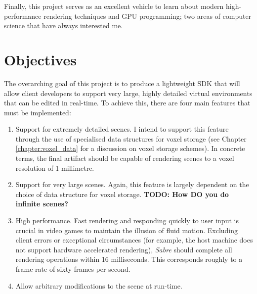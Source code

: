 Finally, this project serves as an excellent vehicle to learn about modern high-performance rendering techniques and GPU programming; two areas of computer science that have always interested me.

\section{Objectives}
The overarching goal of this project is to produce a lightweight SDK that will allow  client developers to support very large, highly detailed virtual environments that can be edited in real-time. To achieve this, there are four main features that must be implemented:

\begin{enumerate}
    \item Support for extremely detailed scenes. I intend to support this feature through the use of specialised data structures for voxel storage (see Chapter \ref{chapter:voxel_data} for a discussion on voxel storage schemes). In concrete terms, the final artifact should be capable of rendering scenes to a voxel resolution of 1 millimetre.
    
    \item Support for very large scenes. Again, this feature is largely dependent on the choice of data structure for voxel storage. \textbf{TODO: How DO you do infinite scenes?}
    
    \item High performance. Fast rendering and responding quickly to user input is crucial in video games to maintain the illusion of fluid motion. Excluding client errors or exceptional circumstances (for example, the host machine does not support hardware accelerated rendering), \textit{Sabre} should complete all rendering operations within 16 milliseconds. This corresponds roughly to a frame-rate of sixty frames-per-second.
    
    \item Allow arbitrary modifications to the scene at run-time.
\end{enumerate}